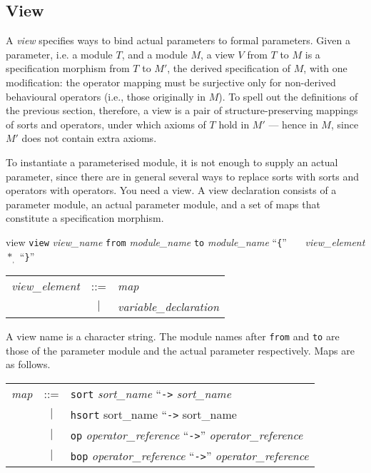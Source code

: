 \documentclass[a4paper]{memoir}
\begin{document}
\subsection{View}\label{sec:p2-view}

A {\em view} specifies ways to
bind actual parameters to formal parameters.
Given a parameter, i.e. a module $T$, and a module $M$,
a view $V$ from $T$ to $M$ is a specification morphism
from $T$ to $M'$, the derived specification of $M$, with one modification:
the operator mapping must be surjective only for
non-derived behavioural operators (i.e., those originally in $M$).
To spell out the definitions of the previous section, therefore,
a view is a pair of structure-preserving mappings of sorts
and operators, under which axioms of $T$ hold in $M'$
--- hence in $M$, since $M'$ does not contain extra axioms.

To instantiate a parameterised module, it is not enough to supply an
actual parameter, since there are in general several ways to
replace sorts with sorts and operators with operators. You need a view.
\label{sec:p2-view-decl}
A view declaration consists of a parameter module, an actual parameter module,
and a set of maps that constitute a specification morphism.

\begin{bsyntax} view \Hline
{}
\texttt{view} \textit{view\_name} \texttt{from} \textit{module\_name} \texttt{to} \textit{module\_name} ``\texttt{\{}''
~~~\textit{view\_element} $*_,$
``\texttt{\}}''
\end{bsyntax}

\begin{tabular}{r c l}
  \textit{view\_element} &::=& \textit{map} \\
                &$|$& \textit{variable\_declaration}
\end{tabular}

A view name is a character string. The module names after \verb|from|
and \verb|to| are those of the parameter module and the actual parameter
respectively. Maps are as follows.

\begin{tabular}{r c l}\index{\texttt{sort}}\index{\texttt{op}}\index{\texttt{hsort}}
\index{\texttt{bop}}
  \textit{map} &::=& \verb|sort| \textit{sort\_name} ``\verb|->| \textit{sort\_name} \\
  &$|$& \verb|hsort| sort\_name ``\verb|->| sort\_name \\
  &$|$& \verb|op| \textit{operator\_reference} ``\verb|->|'' \textit{operator\_reference} \\
  &$|$& \verb|bop| \textit{operator\_reference} ``\verb|->|'' \textit{operator\_reference}
\end{tabular}
\end{document}
